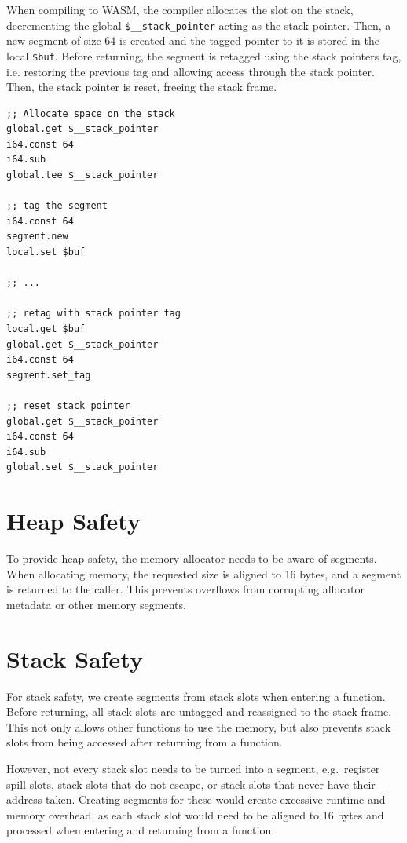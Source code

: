 When compiling to \ac{WASM}, the compiler allocates the slot on the stack, decrementing the global \lstinline[style=customwasm]{$__stack_pointer} acting as the stack pointer.
Then, a new segment of size 64 is created and the tagged pointer to it is stored in the local \lstinline[style=customwasm]{$buf}.
Before returning, the segment is retagged using the stack pointers tag, i.e. restoring the previous tag and allowing access through the stack pointer.
Then, the stack pointer is reset, freeing the stack frame.

\begin{lstlisting}[frame=h,style=customwasm,
    label={lst:wasm-example}]
;; Allocate space on the stack
global.get $__stack_pointer
i64.const 64
i64.sub
global.tee $__stack_pointer

;; tag the segment
i64.const 64
segment.new
local.set $buf

;; ...

;; retag with stack pointer tag
local.get $buf
global.get $__stack_pointer
i64.const 64
segment.set_tag

;; reset stack pointer
global.get $__stack_pointer
i64.const 64
i64.sub
global.set $__stack_pointer
\end{lstlisting}

\section{Heap Safety}
\label{sec:heap-safety}

To provide heap safety, the memory allocator needs to be aware of segments.
When allocating memory, the requested size is aligned to 16 bytes, and a segment is returned to the caller.
This prevents overflows from corrupting allocator metadata or other memory segments.

\section{Stack Safety}
\label{sec:stack-safety}

For stack safety, we create segments from stack slots when entering a function.
Before returning, all stack slots are untagged and reassigned to the stack frame.
This not only allows other functions to use the memory, but also prevents stack slots from being accessed after returning from a function.

However, not every stack slot needs to be turned into a segment, e.g.\ register spill slots, stack slots that do not escape, or stack slots that never have their address taken.
Creating segments for these would create excessive runtime and memory overhead, as each stack slot would need to be aligned to 16 bytes and processed when entering and returning from a function.

